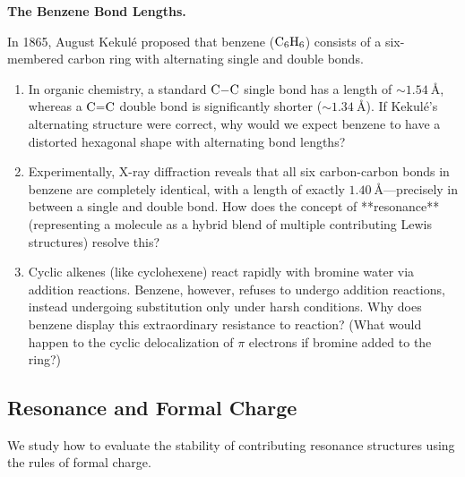 \documentclass[12pt, a4paper]{book}
\begin{document}
\begin{puzzlebox}
\textbf{The Benzene Bond Lengths.}

In 1865, August Kekulé proposed that benzene ($\ce{C6H6}$) consists of a six-membered carbon ring with alternating single and double bonds.
\begin{enumerate}[label=(\alph*), leftmargin=*]
  \item In organic chemistry, a standard $\ce{C-C}$ single bond has a length of $\sim \SI{1.54}{\text{\AA}}$, whereas a $\ce{C=C}$ double bond is significantly shorter ($\sim \SI{1.34}{\text{\AA}}$).
        If Kekulé's alternating structure were correct, why would we expect benzene to have a distorted hexagonal shape with alternating bond lengths?
  \item Experimentally, X-ray diffraction reveals that all six carbon-carbon bonds in benzene are completely identical, with a length of exactly $\SI{1.40}{\text{\AA}}$—precisely in between a single and double bond.
        How does the concept of **resonance** (representing a molecule as a hybrid blend of multiple contributing Lewis structures) resolve this?
  \item Cyclic alkenes (like cyclohexene) react rapidly with bromine water via addition reactions.
        Benzene, however, refuses to undergo addition reactions, instead undergoing substitution only under harsh conditions.
        Why does benzene display this extraordinary resistance to reaction? (What would happen to the cyclic delocalization of $\pi$ electrons if bromine added to the ring?)
\end{enumerate}
\end{puzzlebox}

\subsection{Resonance and Formal Charge}

We study how to evaluate the stability of contributing resonance structures using the rules of formal charge.
\end{document}
